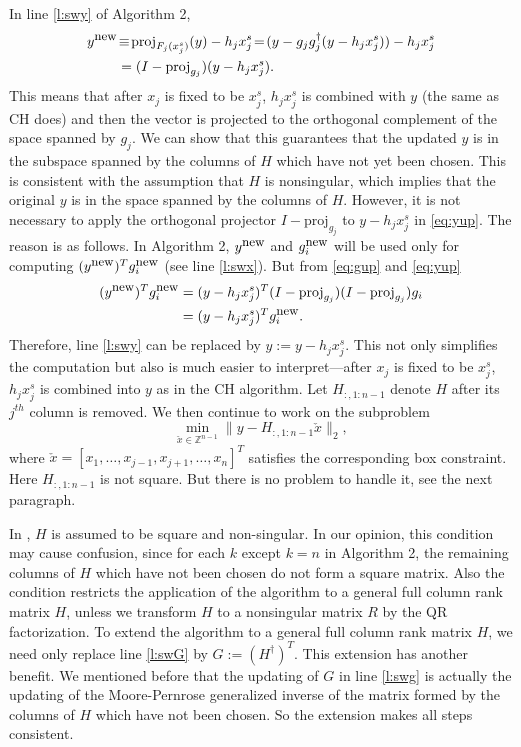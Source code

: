 \documentclass[12pt,Bold,letterpaper]{mcgilletdclass}
\newcommand{\be}{\begin{equation}}
\newcommand{\ee}{\end{equation}}
\begin{document}
In line \ref{l:swy} of Algorithm 2,
\begin{align}
y^{\small \mbox{new}} & \!\equiv\! \mbox{proj}_{F_j(x_j^s)}(y) - h_jx_j^s 
 \!=\! (y -  g_jg_j^\dag(y-h_jx_j^s)) - h_jx_j^s  \nonumber \\
   &=  (I-\mbox{proj}_{g_j})(y-h_jx_j^s). \label{eq:yup}  
\end{align}
This means that after $x_j$ is fixed to be $x_j^s$, $h_jx_j^s$ is combined with $y$ (the same
as CH does)  and then the vector is projected to the orthogonal complement of 
the space spanned by $g_j$. 
We can show that this guarantees that the updated $y$ is in the subspace spanned by
the columns of $H$ which have not yet been chosen.
This is consistent with the assumption that $H$ is nonsingular, which implies that 
the original $y$  is in the space spanned by  the columns of $H$.
However, it is not necessary to apply the orthogonal projector $I- \mbox{proj}_{g_j}$ to $y-h_jx_j^s$ in \eqref{eq:yup}.
The reason is as follows. 
In Algorithm 2, $y^{\small \mbox{new}}$ and $g_i^{\small \mbox{new}}$ will be used only for computing 
$(y^{\small \mbox{new}})^Tg_i^{\small \mbox{new}}$ (see line \ref{l:swx}).
But from \eqref{eq:gup} and \eqref{eq:yup}
\begin{align*}
(y^{\small \mbox{new}})^Tg_i^{\small \mbox{new}}
& =(y-h_jx_j^s)^T(I-\mbox{proj}_{g_j})(I-\mbox{proj}_{g_j})g_i \\
&=(y-h_jx_j^s)^Tg_i^{\small \mbox{new}}.
\end{align*}
Therefore, line \ref{l:swy} can be replaced by $y:=y-h_jx_j^s$.
This not only simplifies the computation but also is much easier to interpret---after $x_j$ is fixed to be $x_j^s$,  
$h_jx_j^s$ is combined into $y$ as in the CH algorithm.
Let $H_{:,1:n-1}$ denote $H$ after its $j^{th}$ column is removed. 
We then continue to work on the subproblem
\be
\min_{\check{x}\in \mathbb{Z}^{n-1}}\|y-H_{:,1:n-1}\check{x}\|_2, 
\label{eq:subs}
\ee
where $\check{x}=[x_1,\ldots,x_{j-1},x_{j+1},\ldots,x_n]^T$ 
satisfies the corresponding box constraint.
Here $H_{:,1:n-1}$ is not square. But there is no problem to handle
it, see the next paragraph.

In \cite{SuW05},  $H$ is assumed to be square and non-singular. 
In our opinion, this condition may cause confusion,
since for each $k$ except $k=n$ in Algorithm 2, 
the remaining columns of $H$ which have not been chosen do not form a square matrix.
Also the condition restricts the application of the algorithm to a general full column rank matrix $H$,
unless we transform $H$ to a nonsingular matrix $R$ by the QR factorization.
To extend the algorithm to a general full column rank matrix $H$, we need only 
replace line \ref{l:swG} by $G:=(H^{\dagger})^T$.
This extension has another benefit. 
We mentioned before that the updating of $G$ in line \ref{l:swg}
is actually the updating of the Moore-Pernrose generalized inverse 
of the matrix formed by the columns of $H$ which have not been chosen. 
So the extension makes all steps consistent.
\end{document}
